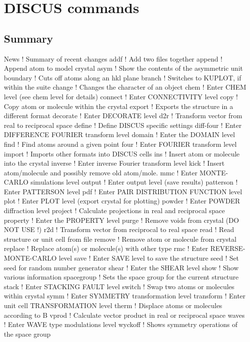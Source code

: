 \chapter{DISCUS commands}
\section{Summary}
\par
\begin{MacVerbatim}
News       ! Summary of recent changes
addf       ! Add two files together
append     ! Append atom to model crystal
asym       ! Show the contents of the asymmetric unit
boundary   ! Cuts off atoms along an hkl plane
branch     ! Switches to KUPLOT, if within the suite
change     ! Changes the character of an object
chem       ! Enter CHEM level (see chem level for details)
connect    ! Enter CONNECTIVITY level
copy       ! Copy atom or molecule within the crystal
export     ! Exports the structure in a different format
decorate   ! Enter  DECORATE level
d2r        ! Transform vector from real to reciprocal space
define     ! Define DISCUS specific settings
diff-four  ! Enter DIFFERENCE FOURIER transform level
domain     ! Enter the DOMAIN level
find       ! Find atoms around a given point
four       ! Enter FOURIER transform level
import     ! Imports other formats into DISCUS cells
ins        ! Insert atom or molecule into the crystal
inverse    ! Enter inverse Fourier transform level
kick       ! Insert atom/molecule and possibly remove old atom/mole.
mmc        ! Enter MONTE-CARLO simulations level
output     ! Enter output level (save results)
patterson  ! Enter PATTERSON level
pdf        ! Enter PAIR DISTRIBUTION FUNCTION level
plot       ! Enter PLOT level (export crystal for plotting)
powder     ! Enter POWDER diffraction level
project    ! Calculate projections in real and reciprocal space
property   ! Enter the PROPERTY level
purge      ! Remove voids from crystal (DO NOT USE !)
r2d        ! Transform vector from reciprocal to real space
read       ! Read structure or unit cell from file
remove     ! Remove atom or molecule from crystal
replace    ! Replace atom(s) or molecule(s) with other type
rmc        ! Enter REVERSE-MONTE-CARLO level
save       ! Enter SAVE level to save the structure
seed       ! Set seed for random number generator
shear      ! Enter the SHEAR level
show       ! Show various information
spacegroup ! Sets the space group for the current structure
stack      ! Enter STACKING FAULT level
switch     ! Swap two atoms or molecules within crystal
symm       ! Enter SYMMETRY transformation level
transform  ! Enter unit cell TRANSFORMATION  level
therm      ! Displace atoms or molecules according to B
vprod      ! Calculate vector product in real or reciprocal space
waves      ! Enter WAVE type modulations level
wyckoff    ! Shows symmetry operations of the space group
\end{MacVerbatim}
